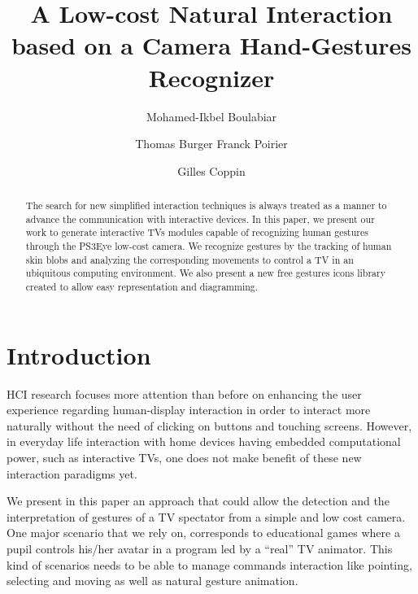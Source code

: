 \documentclass{llncs}
\begin{document}
\frontmatter          %
\pagestyle{headings}  %
\mainmatter              %
%
\title{A Low-cost Natural Interaction based on a Camera Hand-Gestures Recognizer}
\author{Mohamed-Ikbel Boulabiar \and Thomas Burger
Franck Poirier \and Gilles Coppin}
%

\maketitle

\begin{abstract}
The search for new simplified interaction techniques is always treated as a
manner to advance the communication with interactive devices.
In this paper, we present our work to generate interactive TVs modules capable
of recognizing human gestures through the PS3Eye low-cost camera.
We recognize gestures by the tracking of human skin blobs and analyzing the 
corresponding movements to control a TV in an ubiquitous computing environment.
We also present a new free gestures icons library created to allow easy
representation and diagramming.

\end{abstract}
%

\section{Introduction}
HCI research focuses more attention than before on enhancing the user experience regarding human-display interaction in order to interact more naturally without the need of clicking on buttons and touching screens. However, in everyday life interaction with home devices having embedded computational power, such as interactive TVs, one does not make benefit of these new interaction paradigms yet. 

We present in this paper an approach that could allow the detection and the interpretation of gestures of a TV spectator from a simple and low cost camera. 
One major scenario that we rely on, corresponds to educational games where a pupil
controls his/her avatar in a program led by a ``real'' TV animator.
This kind of scenarios needs to be able to manage commands interaction
like pointing, selecting and moving as well as natural gesture animation.
\end{document}

